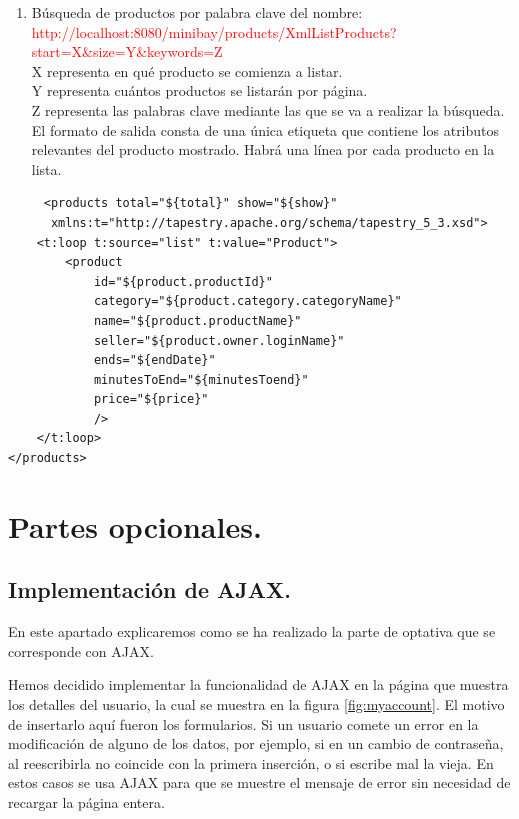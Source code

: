 \documentclass[12pt,a4paper,twoside,spanish]{article}      %
\begin{document}
\begin{enumerate}
    
  \item Búsqueda de productos por palabra clave del nombre:\\ 
      \textcolor{red}{http://localhost:8080/minibay/products/XmlListProducts?start=X\&size=Y\&keywords=Z}\\
    X representa en qué producto se comienza a listar.\\
    Y representa cuántos productos se listarán por página.\\
    Z representa las palabras clave mediante las que se va a realizar la búsqueda.\\
    El formato de salida consta de una única etiqueta que contiene los atributos relevantes del producto mostrado. Habrá una línea
    por cada producto en la lista.
\end{enumerate}

\begin{verbatim}
     <products total="${total}" show="${show}" 
      xmlns:t="http://tapestry.apache.org/schema/tapestry_5_3.xsd">
	<t:loop t:source="list" t:value="Product">
        <product
        	id="${product.productId}"
        	category="${product.category.categoryName}"
        	name="${product.productName}"
        	seller="${product.owner.loginName}"
        	ends="${endDate}"
        	minutesToEnd="${minutesToend}"
        	price="${price}"
        	/>
    </t:loop>
</products> 
\end{verbatim}



\section{Partes opcionales.}

\subsection{Implementación de AJAX.}
En este apartado explicaremos como se ha realizado la parte de optativa que se corresponde con AJAX.

Hemos decidido implementar la funcionalidad de AJAX en la página que muestra los detalles del usuario, la cual se muestra en la figura \ref{fig:myaccount}.
El motivo de insertarlo aquí fueron los formularios. Si un usuario comete un error en la modificación de alguno de los datos, por ejemplo, si en un cambio de
contraseña, al reescribirla no coincide con la primera inserción, o si escribe mal la vieja. En estos casos se usa AJAX para que se muestre el mensaje de error
sin necesidad de recargar la página entera.
\end{document}
